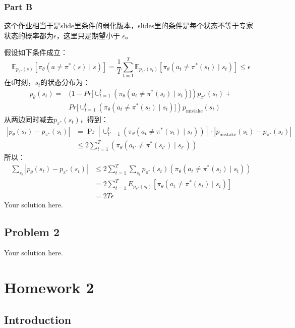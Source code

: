 \documentclass[12pt,oneside]{book}
\begin{document}
\subsection{Part B}
这个作业相当于是slide里条件的弱化版本，slides里的条件是每个状态不等于专家状态的概率都为$\epsilon$，这里只是期望小于
$\epsilon$。

假设如下条件成立：
\begin{equation}
    \mathbb{E}_{p_{\pi^*}(s)} \left[\pi_{\theta}(a \ne \pi^*(s) \mid s)\right] 
    = \frac{1}{T} \sum_{t=1}^{T} \mathbb{E}_{p_{\pi^*}(s_t)} \left[\pi_{\theta}(a_t \ne \pi^*(s_t) \mid s_t)\right]
    \leq \epsilon
\end{equation}
在t时刻，$s_t$的状态分布为：
\begin{align}
    p_{\theta}(s_t) = 
    &(1 - Pr[\cup_{t=1}^{t}(\pi_{\theta}(a_t \ne \pi^*(s_t) \mid s_t)]) p_{\pi^*}(s_t) + \nonumber \\
    &Pr[\cup_{t=1}^{t}(\pi_{\theta}(a_t \ne \pi^*(s_t) \mid s_t)]) p_{\text{mistake}}(s_t)
\end{align}
从两边同时减去$ p_{\pi^*}(s_t)$，得到：
\begin{align}
    |p_{\theta}(s_t) - p_{\pi^*}(s_t)| 
    &= \Pr\left[\cup_{t'=1}^{t} \left(\pi_{\theta}(a_{t} \ne \pi^*(s_{t}) \mid s_{t})\right)\right] \cdot |p_{\text{mistake}}(s_t) - p_{\pi^*}(s_t)| \nonumber \\
    &\leq 2\sum_{t=1}^{T}(\pi_{\theta}(a_{t'} \ne \pi^*(s_{t'}) \mid s_{t'}))
\end{align}
所以：
\begin{align}
    \sum_{s_t}|p_{\theta}(s_t) - p_{\pi^*}(s_t)| 
    &\leq 2\sum_{t=1}^{T}\sum_{s_t}p_{\pi^*}(s_t)(\pi_{\theta}(a_{t} \ne \pi^*(s_{t}) \mid s_{t})) \nonumber \\
    &= 2\sum_{t=1}^{T}E_{p_{\pi^*}(s_t)}[\pi_{\theta}(a_{t} \ne \pi^*(s_{t}) \mid s_{t})] \nonumber \\
    &= 2T\epsilon
\end{align}
Your solution here.

\section{Problem 2}

Your solution here.

\chapter{Homework 2}

\section{Introduction}
\end{document}
